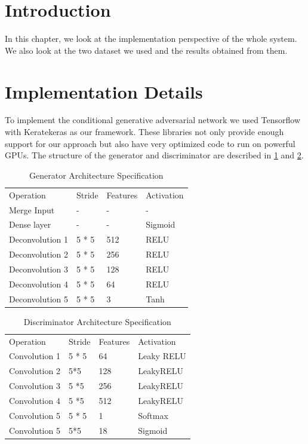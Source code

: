 \doublespacing
{}
\label{chap:EnR}

\section{Introduction}

In this chapter, we look at the implementation perspective of the whole system. We also look at the two dataset we used and the results obtained from them. 

\section{Implementation Details}
To implement the conditional generative adversarial network we used Tensorflow \cite{tensorflow2015-whitepaper} with Kera\ci te{keras} as our framework. These libraries not only provide enough support for our approach but also have very optimized code to run on powerful GPUs. The structure of the generator and discriminator are described in \cref{Generator-Activation} and \cref{Discriminator-Table}.
\begin{table}[ht]
\centering
\caption{Generator Architecture Specification}
\label{Generator-Activation}
\begin{tabular}{llll}
Operation       & Stride & Features & Activation \\
Merge Input     & -      & -        & -          \\
Dense layer     & -      & -        & Sigmoid    \\
Deconvolution 1 & 5 * 5  & 512      & RELU       \\
Deconvolution 2 & 5 * 5    & 256      & RELU       \\
Deconvolution 3 & 5 * 5   & 128      & RELU       \\
Deconvolution 4 & 5 * 5   & 64       & RELU       \\
Deconvolution 5 & 5 * 5  & 3        & Tanh      
\end{tabular}
\end{table}
\begin{table}[ht]
\centering
\caption{Discriminator Architecture Specification}
\label{Discriminator-Table}
\begin{tabular}{llll}
Operation     & Stride & Features & Activation \\
Convolution 1 & 5 * 5  & 64       & Leaky RELU \\
Convolution 2 & 5*5    & 128      & LeakyRELU  \\
Convolution 3 & 5 *5   & 256      & LeakyRELU  \\
Convolution 4 & 5 *5   & 512      & LeakyRELU  \\
Convolution 5 & 5 * 5  & 1        & Softmax    \\
Convolution 5 & 5*5    & 18       & Sigmoid   
\end{tabular}
\end{table}
